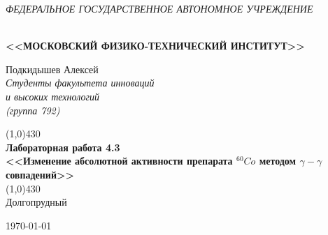\documentclass[a4paper,12pt]{article}
\theoremstyle{plain} %
\theoremstyle{definition} %
\theoremstyle{remark} %
\renewcommand{\headrulewidth}{0mm}  %
\begin{document}

\begin{center}
	\textit{\MakeTextUppercase{федеральное государственное автономное учреждение}}
		
	\vspace{0.5ex}
	
	\textbf{ \\ \MakeTextUppercase{<<Московский Физико-технический институт>>}}
\end{center}
\vspace{13ex}
\begin{flushright}
	\noindent
	{Подкидышев Алексей}\\
	
	\textit{Студенты факультета инноваций\\ и высоких технологий\\(группа 792)}
\end{flushright}
\begin{center}
	\vspace{23ex}
	\line(1,0){430}\\[4ex]
	{\LARGE\textbf{Лабораторная работа 4.3}}
	\vspace{2ex}\\
	\textbf{\large{<<Изменение абсолютной активности препарата $^{60}Co$  методом $\gamma - \gamma$ совпадений>>}}\\[3ex]
	\line(1,0){430}\\[5ex]
	\vfill
	Долгопрудный 
	
	{\today}
\end{center}
\newpage
\renewcommand{\headrulewidth}{1pt}
\end{document}
